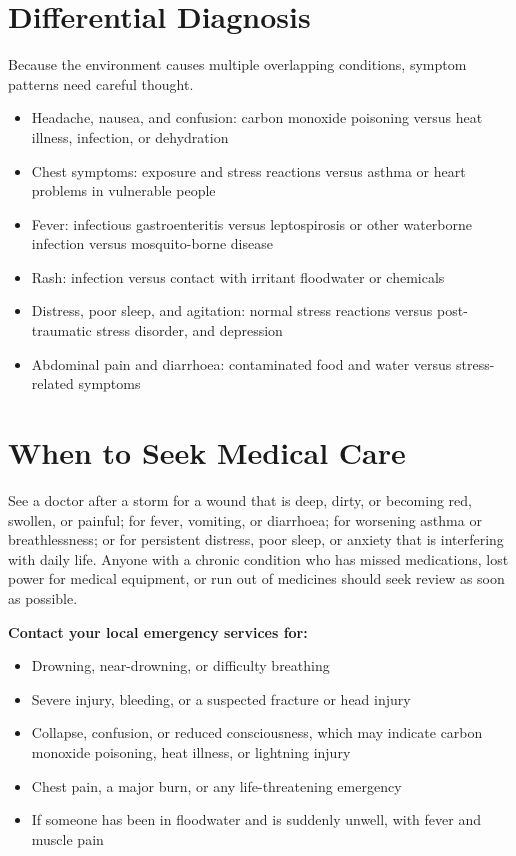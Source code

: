 \section*{Differential Diagnosis}
Because the environment causes multiple overlapping conditions, symptom patterns need careful thought.

\begin{itemize}
    \item Headache, nausea, and confusion: carbon monoxide poisoning versus heat illness, infection, or dehydration
    \item Chest symptoms: exposure and stress reactions versus asthma or heart problems in vulnerable people
    \item Fever: infectious gastroenteritis versus leptospirosis or other waterborne infection versus mosquito-borne disease
    \item Rash: infection versus contact with irritant floodwater or chemicals
    \item Distress, poor sleep, and agitation: normal stress reactions versus post-traumatic stress disorder, and depression
    \item Abdominal pain and diarrhoea: contaminated food and water versus stress-related symptoms
\end{itemize}

\section*{When to Seek Medical Care}
See a doctor after a storm for a wound that is deep, dirty, or becoming red, swollen, or painful; for fever, vomiting, or diarrhoea; for worsening asthma or breathlessness; or for persistent distress, poor sleep, or anxiety that is interfering with daily life. Anyone with a chronic condition who has missed medications, lost power for medical equipment, or run out of medicines should seek review as soon as possible.

\textbf{Contact your local emergency services for:}
\begin{itemize}
    \item Drowning, near-drowning, or difficulty breathing
    \item Severe injury, bleeding, or a suspected fracture or head injury
    \item Collapse, confusion, or reduced consciousness, which may indicate carbon monoxide poisoning, heat illness, or lightning injury
    \item Chest pain, a major burn, or any life-threatening emergency
    \item If someone has been in floodwater and is suddenly unwell, with fever and muscle pain
\end{itemize}


